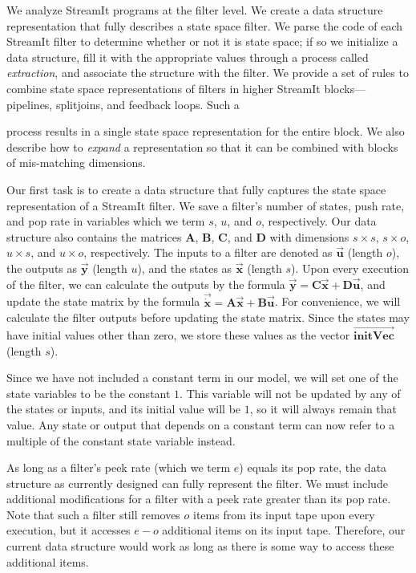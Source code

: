 \label{sec:statespace}

We analyze StreamIt programs at the filter level. We create a data
structure representation that fully describes a state space filter. We
parse the code of each StreamIt filter to determine whether or not it
is state space; if so we initialize a data structure, fill it with the
appropriate values through a process called \emph{extraction}, and
associate the structure with the filter. We provide a set of rules to
combine state space representations of filters in higher StreamIt
blocks---pipelines, splitjoins, and feedback loops. Such a 
\clearpage

\noindent process results in a single state space representation for 
the entire block. We also describe how to \emph{expand} a
representation so that it can be combined with blocks of mis-matching
dimensions.


Our first task is to create a data structure that fully captures the
state space representation of a StreamIt filter.  We save a 
filter's number of states, push rate, and pop rate in variables which
we term $s$, $u$, and $o$, respectively. Our data structure also
contains the matrices $\mathbf{A}$, $\mathbf{B}$, $\mathbf{C}$, and
$\mathbf{D}$ with dimensions $s \times s$, $s
\times o$, $u \times s$, and $u \times o$, respectively. The
inputs to a filter are denoted as $\vec{\mathbf{u}}$ (length $o$), the
outputs as $\vec{\mathbf{y}}$ (length $u$), and the states as
$\vec{\mathbf{x}}$ (length $s$). Upon every execution of the filter,
we can calculate the outputs by the formula $\vec{\mathbf{y}} =
\mathbf{C}\vec{\mathbf{x}} +
\mathbf{D}\vec{\mathbf{u}}$, and update the state matrix by the
formula $\vec{\dot{\mathbf{x}}} = \mathbf{A}\vec{\mathbf{x}} +
\mathbf{B}\vec{\mathbf{u}}$. For convenience, we will calculate
the filter outputs before updating the state matrix. Since the
states may have initial values other than zero, we store these
values as the vector $\overrightarrow{\mathbf{initVec}}$ (length
$s$).

Since we have not included a constant term in our model, we will set
one of the state variables to be the constant $1$. This variable will
not be updated by any of the states or inputs, and its initial value
will be $1$, so it will always remain that value. Any state or output
that depends on a constant term can now refer to a multiple of the
constant state variable instead.

As long as a filter's peek rate (which we term $e$) equals its pop
rate, the data structure as currently designed can fully represent the
filter. We must include additional modifications for a filter with a
peek rate greater than its pop rate. Note that such a filter still
removes $o$ items from its input tape upon every execution, but it
accesses $e-o$ additional items on its input tape. Therefore, our
current data structure would work as long as there is some way to
access these additional items.

